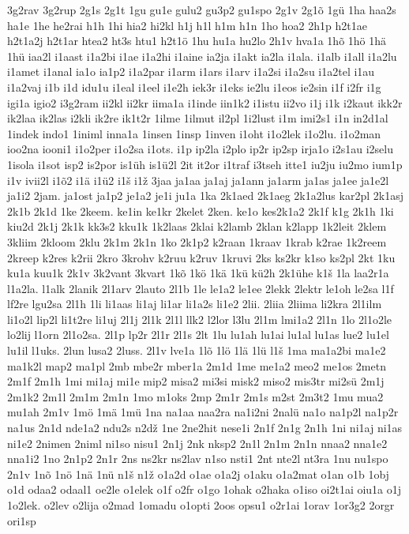 {3g2rav
3g2rup
2g1s
2g1t
1gu
gu1e
gulu2
gu3p2
gu1spo
2g1v
2g1õ
1gü
1ha
haa2s
ha1e
1he
he2rai
h1h
1hi
hia2
hi2kl
h1j
h1l
h1m
h1n
1ho
hoa2
2h1p
h2t1ae
h2t1a2j
h2t1ar
htea2
ht3s
htu1
h2t1ö
1hu
hu1a
hu2lo
2h1v
hva1a
1hõ
1hö
1hä
1hü
iaa2l
i1aast
i1a2bi
i1ae
i1a2hi
i1aine
ia2ja
i1akt
ia2la
i1ala.
i1alb
i1all
i1a2lu
i1amet
i1anal
ia1o
ia1p2
i1a2par
i1arm
i1ars
i1arv
i1a2si
i1a2su
i1a2tel
i1au
i1a2vaj
i1b
i1d
idu1u
i1eal
i1eel
i1e2h
iek3r
i1eks
ie2lu
i1eos
ie2sin
i1f
i2fr
i1g
igi1a
igio2
i3g2ram
ii2kl
ii2kr
iima1a
i1inde
iin1k2
i1istu
ii2vo
i1j
i1k
i2kaut
ikk2r
ik2laa
ik2las
i2kli
ik2re
ik1t2r
1ilme
1ilmut
il2pl
1i2lust
i1m
imi2s1
i1n
in2d1al
1indek
indo1
1iniml
inna1a
1insen
1insp
1inven
i1oht
i1o2lek
i1o2lu.
i1o2man
ioo2na
iooni1
i1o2per
i1o2sa
i1ots.
i1p
ip2la
i2plo
ip2r
ip2sp
irja1o
i2s1au
i2selu
1isola
i1sot
isp2
is2por
is1üh
is1ü2l
2it
it2or
i1traf
i3tseh
itte1
iu2ju
iu2mo
ium1p
i1v
ivii2l
i1õ2
i1ä
i1ü2
i1š
i1ž
3jaa
ja1aa
ja1aj
ja1ann
ja1arm
ja1as
ja1ee
ja1e2l
ja1i2
2jam.
ja1ost
ja1p2
je1a2
je1i
ju1a
1ka
2k1aed
2k1aeg
2k1a2lus
kar2pl
2k1asj
2k1b
2k1d
1ke
2keem.
ke1in
ke1kr
2kelet
2ken.
ke1o
kes2k1a2
2k1f
k1g
2k1h
1ki
kiu2d
2k1j
2k1k
kk3s2
kku1k
1k2laas
2klai
k2lamb
2klan
k2lapp
1k2leit
2klem
3kliim
2kloom
2klu
2k1m
2k1n
1ko
2k1p2
k2raan
1kraav
1krab
k2rae
1k2reem
2kreep
k2res
k2rii
2kro
3krohv
k2ruu
k2ruv
1kruvi
2ks
ks2kr
k1so
ks2pl
2kt
1ku
ku1a
kuu1k
2k1v
3k2vant
3kvart
1kõ
1kö
1kä
1kü
kü2h
2k1ühe
k1š
1la
laa2r1a
l1a2la.
l1alk
2lanik
2l1arv
2lauto
2l1b
1le
le1a2
le1ee
2lekk
2lektr
le1oh
le2sa
l1f
lf2re
lgu2sa
2l1h
1li
li1aas
li1aj
li1ar
li1a2s
li1e2
2lii.
2liia
2liima
li2kra
2l1ilm
li1o2l
lip2l
li1t2re
li1uj
2l1j
2l1k
2l1l
llk2
l2lor
l3lu
2l1m
lmi1a2
2l1n
1lo
2l1o2le
lo2lij
l1orn
2l1o2sa.
2l1p
lp2r
2l1r
2l1s
2lt
1lu
lu1ah
lu1ai
lu1al
lu1as
lue2
lu1el
lu1il
l1uks.
2lun
lusa2
2luss.
2l1v
lve1a
1lõ
1lö
1lä
1lü
l1š
1ma
ma1a2bi
ma1e2
ma1k2l
map2
ma1pl
2mb
mbe2r
mber1a
2m1d
1me
me1a2
meo2
me1os
2metn
2m1f
2m1h
1mi
mi1aj
mi1e
mip2
misa2
mi3si
misk2
miso2
mis3tr
mi2sü
2m1j
2m1k2
2m1l
2m1m
2m1n
1mo
m1oks
2mp
2m1r
2m1s
m2st
2m3t2
1mu
mua2
mu1ah
2m1v
1mö
1mä
1mü
1na
na1aa
naa2ra
na1i2ni
2nalü
na1o
na1p2l
na1p2r
na1us
2n1d
nde1a2
ndu2s
n2dž
1ne
2ne2hit
nese1i
2n1f
2n1g
2n1h
1ni
ni1aj
ni1as
ni1e2
2nimen
2niml
ni1so
nisu1
2n1j
2nk
nksp2
2n1l
2n1m
2n1n
nnaa2
nna1e2
nna1i2
1no
2n1p2
2n1r
2ns
ns2kr
ns2lav
n1so
nsti1
2nt
nte2l
nt3ra
1nu
nu1spo
2n1v
1nõ
1nö
1nä
1nü
n1š
n1ž
o1a2d
o1ae
o1a2j
o1aku
o1a2mat
o1an
o1b
1obj
o1d
odaa2
odaal1
oe2le
o1elek
o1f
o2fr
o1go
1ohak
o2haka
o1iso
oi2t1ai
oiu1a
o1j
1o2lek.
o2lev
o2lija
o2mad
1omadu
o1opti
2oos
opsu1
o2r1ai
1orav
1or3g2
2orgr
ori1sp
}
